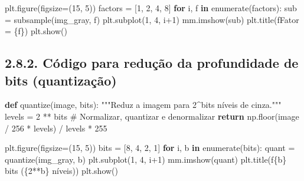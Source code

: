 \documentclass[
  portuguese,
  letterpaper,
  openany,
  oneside,
  12pt,
  a4paper]{book}
\newenvironment{Shaded}{\begin{snugshade}}{\end{snugshade}}
\newcommand{\BuiltInTok}[1]{\textcolor[rgb]{0.00,0.23,0.31}{#1}}
\newcommand{\CommentTok}[1]{\textcolor[rgb]{0.37,0.37,0.37}{#1}}
\newcommand{\ControlFlowTok}[1]{\textcolor[rgb]{0.00,0.23,0.31}{\textbf{#1}}}
\newcommand{\DecValTok}[1]{\textcolor[rgb]{0.68,0.00,0.00}{#1}}
\newcommand{\KeywordTok}[1]{\textcolor[rgb]{0.00,0.23,0.31}{\textbf{#1}}}
\newcommand{\NormalTok}[1]{\textcolor[rgb]{0.00,0.23,0.31}{#1}}
\newcommand{\OperatorTok}[1]{\textcolor[rgb]{0.37,0.37,0.37}{#1}}
\newcommand{\SpecialCharTok}[1]{\textcolor[rgb]{0.37,0.37,0.37}{#1}}
\newcommand{\SpecialStringTok}[1]{\textcolor[rgb]{0.13,0.47,0.30}{#1}}
\begin{document}
\begin{tcolorbox}
\begin{Shaded}
\begin{Highlighting}[]
\NormalTok{plt.figure(figsize}\OperatorTok{=}\NormalTok{(}\DecValTok{15}\NormalTok{, }\DecValTok{5}\NormalTok{))}
\NormalTok{factors }\OperatorTok{=}\NormalTok{ [}\DecValTok{1}\NormalTok{, }\DecValTok{2}\NormalTok{, }\DecValTok{4}\NormalTok{, }\DecValTok{8}\NormalTok{]}
\ControlFlowTok{for}\NormalTok{ i, f }\KeywordTok{in} \BuiltInTok{enumerate}\NormalTok{(factors):}
\NormalTok{    sub }\OperatorTok{=}\NormalTok{ subsample(img\_gray, f)}
\NormalTok{    plt.subplot(}\DecValTok{1}\NormalTok{, }\DecValTok{4}\NormalTok{, i}\OperatorTok{+}\DecValTok{1}\NormalTok{)}
\NormalTok{    mm.imshow(sub)}
\NormalTok{    plt.title(}\SpecialStringTok{f\textquotesingle{}Fator = }\SpecialCharTok{\{}\NormalTok{f}\SpecialCharTok{\}}\SpecialStringTok{\textquotesingle{}}\NormalTok{)}
\NormalTok{plt.show()}
\end{Highlighting}
\end{Shaded}

\subsection{2.8.2. Código para redução da profundidade de bits
(quantização)}\label{cuxf3digo-para-reduuxe7uxe3o-da-profundidade-de-bits-quantizauxe7uxe3o}

\begin{Shaded}
\begin{Highlighting}[]
\KeywordTok{def}\NormalTok{ quantize(image, bits):}
    \CommentTok{"""Reduz a imagem para 2\^{}bits níveis de cinza."""}
\NormalTok{    levels }\OperatorTok{=} \DecValTok{2} \OperatorTok{**}\NormalTok{ bits}
    \CommentTok{\# Normalizar, quantizar e denormalizar}
    \ControlFlowTok{return}\NormalTok{ np.floor(image }\OperatorTok{/} \DecValTok{256} \OperatorTok{*}\NormalTok{ levels) }\OperatorTok{/}\NormalTok{ levels }\OperatorTok{*} \DecValTok{255}

\NormalTok{plt.figure(figsize}\OperatorTok{=}\NormalTok{(}\DecValTok{15}\NormalTok{, }\DecValTok{5}\NormalTok{))}
\NormalTok{bits }\OperatorTok{=}\NormalTok{ [}\DecValTok{8}\NormalTok{, }\DecValTok{4}\NormalTok{, }\DecValTok{2}\NormalTok{, }\DecValTok{1}\NormalTok{]}
\ControlFlowTok{for}\NormalTok{ i, b }\KeywordTok{in} \BuiltInTok{enumerate}\NormalTok{(bits):}
\NormalTok{    quant }\OperatorTok{=}\NormalTok{ quantize(img\_gray, b)}
\NormalTok{    plt.subplot(}\DecValTok{1}\NormalTok{, }\DecValTok{4}\NormalTok{, i}\OperatorTok{+}\DecValTok{1}\NormalTok{)}
\NormalTok{    mm.imshow(quant)}
\NormalTok{    plt.title(}\SpecialStringTok{f\textquotesingle{}}\SpecialCharTok{\{}\NormalTok{b}\SpecialCharTok{\}}\SpecialStringTok{ bits (}\SpecialCharTok{\{}\DecValTok{2}\OperatorTok{**}\NormalTok{b}\SpecialCharTok{\}}\SpecialStringTok{ níveis)\textquotesingle{}}\NormalTok{)}
\NormalTok{plt.show()}
\end{Highlighting}
\end{Shaded}


\end{tcolorbox}
\end{document}
